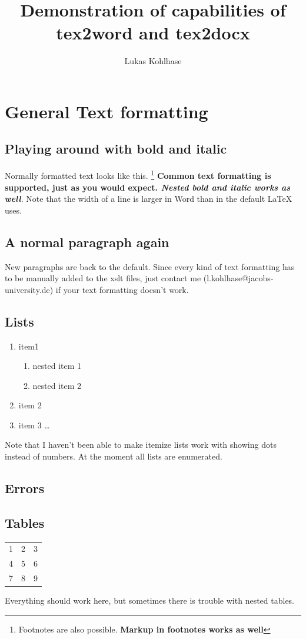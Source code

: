 \documentclass{article}
\author{Lukas Kohlhase}
\title{Demonstration of capabilities of tex2word and tex2docx}
\begin{document}
\maketitle
\section{General Text formatting}
\subsection{Playing around with bold and italic}
Normally formatted text looks like this. \footnote{Footnotes are also possible. \textbf{Markup in footnotes works as well}} \textbf{Common text formatting is supported, just as you would expect. \textit {Nested bold and italic works as well}}. Note that the width of a line is larger in Word than in the default LaTeX uses.  \\ 
\subsection{A normal paragraph again}
New paragraphs are back to the default. Since every kind of text formatting has to be manually added to the xslt files, just contact me (l.kohlhase@jacobs-university.de) if your text formatting doesn't work. 
\subsection{Lists}
\begin{enumerate}
\item item1
\begin{enumerate}
\item nested item 1
\item nested item 2
\end{enumerate}
\item item 2 
\item item 3 \ldots 
\end{enumerate}
Note that I haven't been able to make itemize lists work with showing dots instead of numbers. At the moment all lists are enumerated.
\subsection{Errors}
\nonsensicaltag 
\subsection {Tables}
\begin{tabular}{ c c c }
  1 & 2 & 3 \\
  4 & 5 & 6 \\
  7 & 8 & 9 \\
\end{tabular}
Everything should work here, but sometimes there is trouble with nested tables. 
\end{document}
